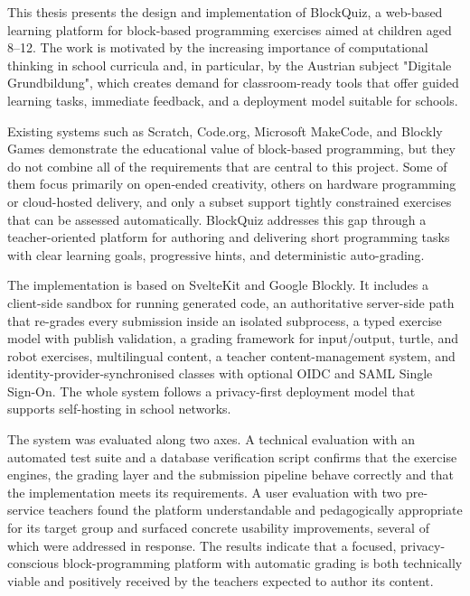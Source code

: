 
This thesis presents the design and implementation of BlockQuiz, a web-based learning platform
for block-based programming exercises aimed at children aged 8--12. The work is motivated by the increasing importance of
computational thinking in school curricula and, in particular, by the Austrian subject "Digitale Grundbildung",
which creates demand for classroom-ready tools
that offer guided learning tasks, immediate feedback, and a deployment model suitable for schools.

Existing systems such as Scratch, Code.org, Microsoft MakeCode, and Blockly Games demonstrate the educational value of
block-based programming, but
they do not combine all of the requirements that are central to this project.
Some of them focus primarily on open-ended creativity, others on hardware programming or cloud-hosted delivery, and only a
subset support tightly constrained
exercises that can be assessed automatically.
BlockQuiz addresses this gap through a teacher-oriented platform for authoring and delivering short programming tasks with
clear learning goals, progressive hints, and
deterministic auto-grading.

The implementation is based on SvelteKit and Google Blockly. It includes a client-side sandbox for
running generated code, an authoritative server-side path that re-grades every submission inside an
isolated subprocess, a typed exercise model with publish validation, a grading framework for
input/output, turtle, and robot exercises, multilingual content, a teacher content-management system,
and identity-provider-synchronised classes with optional OIDC and SAML Single Sign-On. The whole
system follows a privacy-first deployment model that supports self-hosting in school networks.

The system was evaluated along two axes. A technical evaluation with an automated test suite and a
database verification script confirms that the exercise engines, the grading layer and the submission
pipeline behave correctly and that the implementation meets its requirements. A user evaluation with
two pre-service teachers found the platform understandable and pedagogically appropriate for its
target group and surfaced concrete usability improvements, several of which were addressed in
response. The results indicate that a focused, privacy-conscious block-programming platform with
automatic grading is both technically viable and positively received by the teachers expected to
author its content.
